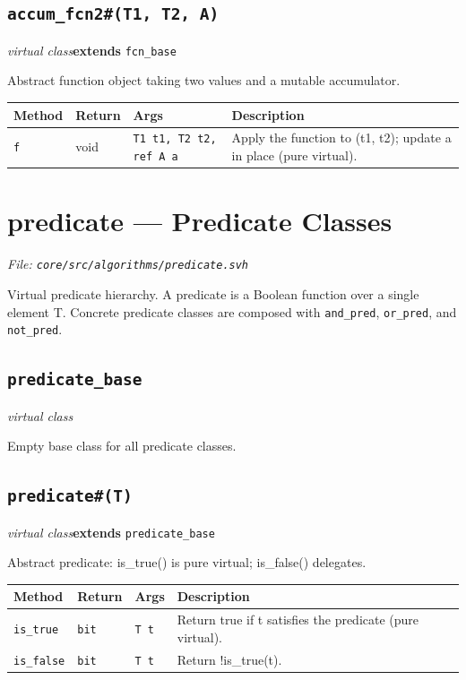 \documentclass[11pt,letterpaper]{report}
\begin{document}
\subsection*{\texttt{accum\_fcn2\#(T1, T2, A)}}
\noindent\small\textit{virtual class}\quad \textbf{extends} \texttt{fcn\_base}\par

Abstract function object taking two values and a mutable accumulator.

\begin{xltabular}{\linewidth}{>{\small}p{1.35in} >{\small}p{1.25in} >{\small}p{0.95in} >{\small}X}
\toprule
\textbf{Method} & \textbf{Return} & \textbf{Args} & \textbf{Description} \\
\midrule
\endhead
\bottomrule
\endfoot
\texttt{f} & void & \texttt{T1 t1, T2 t2, ref A a} & Apply the function to (t1, t2); update a in place (pure virtual). \\
\end{xltabular}

\section{predicate --- Predicate Classes}
\noindent\small\textit{File: \texttt{core/src/algorithms/predicate.svh}}\par

Virtual predicate hierarchy. A predicate is a Boolean function over a single element T. Concrete predicate classes are composed with \texttt{and\_pred}, \texttt{or\_pred}, and \texttt{not\_pred}.

\subsection*{\texttt{predicate\_base}}
\noindent\small\textit{virtual class}\par

Empty base class for all predicate classes.


\subsection*{\texttt{predicate\#(T)}}
\noindent\small\textit{virtual class}\quad \textbf{extends} \texttt{predicate\_base}\par

Abstract predicate: is\_true() is pure virtual; is\_false() delegates.

\begin{xltabular}{\linewidth}{>{\small}p{1.35in} >{\small}p{1.25in} >{\small}p{0.95in} >{\small}X}
\toprule
\textbf{Method} & \textbf{Return} & \textbf{Args} & \textbf{Description} \\
\midrule
\endhead
\bottomrule
\endfoot
\texttt{is\_true} & \texttt{bit} & \texttt{T t} & Return true if t satisfies the predicate (pure virtual). \\
\texttt{is\_false} & \texttt{bit} & \texttt{T t} & Return !is\_true(t). \\
\end{xltabular}
\end{document}
